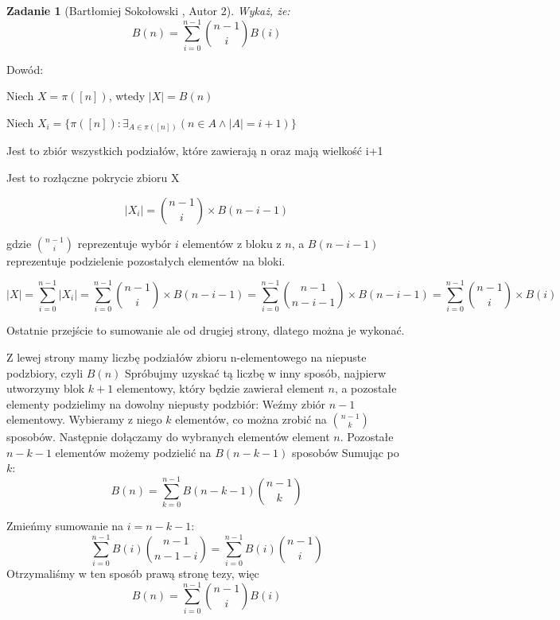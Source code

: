 \documentclass{mwart}
\newtheorem{zad}{Zadanie}[section]
\begin{document}
\begin{zad}[Bartłomiej Sokołowski , Autor 2]
    Wykaż, że:
    \[B(n) = \sum_{i=0}^{n-1} \binom{n-1}{i}B(i)\]
\end{zad}
\begin{mdframed}
    \item Dowód:
    \item Niech $X = \pi([n])$, wtedy $|X| = B(n)$
    \item Niech $X_i = \{\pi([n]) : \exists_{A \in \pi([n])} (n \in A \land |A| = i + 1)\}$
    \item Jest to zbiór wszystkich podziałów, które zawierają n oraz mają wielkość i+1
    \item Jest to rozłączne pokrycie zbioru X 
    \item \[ |X_i| = \binom{n-1}{i} \times B(n-i-1)\]
    \item gdzie $\binom{n-1}{i}$ reprezentuje wybór $i$ elementów z bloku z $n$, a $B(n-i-1)$ reprezentuje podzielenie pozostałych elementów na bloki.
    \item \[ |X| = \sum_{i=0}^{n-1} |X_i| = \sum_{i=0}^{n-1}\binom{n-1}{i} \times B(n-i-1) = \sum_{i=0}^{n-1} \binom{n-1}{n-i-1} \times B(n-i-1) = \sum_{i=0}^{n-1} \binom{n-1}{i} \times B(i)\]
    \item Ostatnie przejście to sumowanie ale od drugiej strony, dlatego można je wykonać.
\end{mdframed}
\begin{mdframed}
    Z lewej strony mamy liczbę podziałów zbioru n-elementowego na niepuste podzbiory, czyli $B(n)$
    \newline \newline
    Spróbujmy uzyskać tą liczbę w inny sposób, najpierw utworzymy blok $k+1$ elementowy, który będzie 
    zawierał element $n$, a pozostałe elementy podzielimy na dowolny niepusty podzbiór:
    \newline \newline
    Weźmy zbiór $n-1$ elementowy. Wybieramy z niego $k$ elementów, co można zrobić na $\binom{n-1}{k}$
    sposobów. Następnie dołączamy do wybranych elementów element $n$. Pozostałe $n-k-1$ elementów
    możemy podzielić na $B(n-k-1)$ sposobów
    \newline
    Sumując po $k$:
    \newline \newline
    \[B(n) = \sum_{k=0}^{n-1}B{(n-k-1)}\binom{n-1}{k} \]
    
    Zmieńmy sumowanie na $i=n-k-1$:
    \[\sum_{i=0}^{n-1}B(i)\binom{n-1}{n-1-i} = \sum_{i=0}^{n-1}B(i)\binom{n-1}{i} \]
    \newline
    Otrzymaliśmy w ten sposób prawą stronę tezy, więc
    \newline 
    \[B(n) = \sum_{i=0}^{n-1} \binom{n-1}{i}B(i)\]
\end{mdframed}
\end{document}

